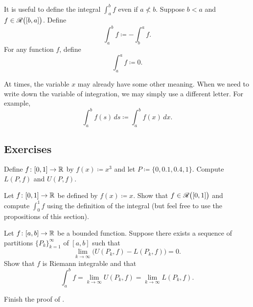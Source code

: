 It is useful to define the integral $\int_a^b f$ even if
$a \nless b$.  Suppose $b < a$ and $f \in {\mathscr{R}}\bigl([b,a]\bigr)$.
Define
\begin{equation*}
\int_a^b f \coloneqq - \int_b^a f .
\end{equation*}
For any function $f$, define
\begin{equation*}
\int_a^a f \coloneqq 0 .
\end{equation*}

At times, the variable $x$ may already have some other meaning.  When
we need to write down the variable of integration, we may simply
use a different letter.  For example,
\begin{equation*}
\int_a^b f(s)\,ds \coloneqq \int_a^b f(x)\,dx .
\end{equation*}

\subsection{Exercises}

\begin{exercise}
Define $f \colon [0,1] \to {\mathbb{R}}$ by $f(x) \coloneqq x^3$
and let $P \coloneqq \{ 0, 0.1, 0.4, 1 \}$.  Compute $L(P,f)$ and $U(P,f)$.
\end{exercise}

\begin{exercise}
Let $f \colon [0,1] \to {\mathbb{R}}$ be defined by $f(x) \coloneqq x$.
Show that $f \in {\mathscr{R}}\bigl([0,1]\bigr)$ and
compute $\int_0^1 f$ using the definition of the integral
(but
feel free to use the propositions of this section).%
\end{exercise}

\begin{exercise}
Let $f \colon [a,b] \to {\mathbb{R}}$ be a bounded function.
Suppose there exists a sequence of partitions $\{ P_k \}_{k=1}^\infty$ of $[a,b]$
such that
\begin{equation*}
\lim_{k \to \infty} \bigl( U(P_k,f) - L(P_k,f) \bigr) = 0 .
\end{equation*}
Show that $f$ is Riemann integrable and that
\begin{equation*}
\int_a^b f = 
\lim_{k \to \infty} U(P_k,f)
=
\lim_{k \to \infty} L(P_k,f) .
\end{equation*}
\end{exercise}

\begin{exercise}
Finish the proof of .
\end{exercise}

